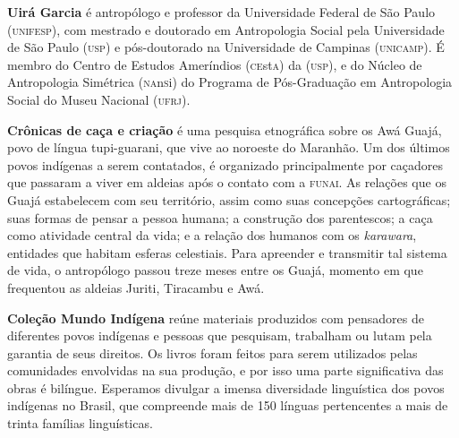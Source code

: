 \textbf{Uirá Garcia} é antropólogo e professor da Universidade Federal de São Paulo \textsc{(unifesp)}, com mestrado e doutorado em Antropologia Social pela Universidade de São Paulo \textsc{(usp)} e pós-doutorado na Universidade de Campinas \textsc{(unicamp)}. 
É membro do Centro de Estudos Ameríndios (\textsc{ce}st\textsc{a}) da \textsc{(usp)}, e do Núcleo de Antropologia Simétrica (\textsc{na}n\textsc{s}i) do Programa de Pós-Graduação em Antropologia Social do Museu Nacional (\textsc{ufrj}). %
	
\textbf{Crônicas de caça e criação} é uma pesquisa etnográfica sobre os Awá Guajá, povo de língua tupi-guarani, que vive ao noroeste do Maranhão. Um dos últimos povos indígenas a serem contatados, é organizado principalmente por caçadores que passaram a viver em aldeias após o contato com a \textsc{funai}. As relações que os Guajá estabelecem com seu território, assim como suas concepções cartográficas; suas formas de pensar a pessoa humana; a construção dos parentescos; a caça como atividade central da vida; e a relação dos humanos com os \emph{karawara}, entidades que habitam esferas celestiais. Para apreender e transmitir tal sistema de vida, o antropólogo passou treze meses entre os Guajá, momento em que frequentou as aldeias Juriti, Tiracambu e Awá.

\textbf{Coleção Mundo Indígena} reúne materiais produzidos com pensadores de diferentes povos indígenas e pessoas que pesquisam, trabalham ou lutam pela garantia de seus direitos. Os livros foram feitos para serem utilizados pelas comunidades envolvidas na sua produção, e por isso uma parte significativa das obras é bilíngue. Esperamos divulgar a imensa diversidade linguística dos povos indígenas no Brasil, que compreende mais de 150 línguas pertencentes a mais de trinta famílias linguísticas.




